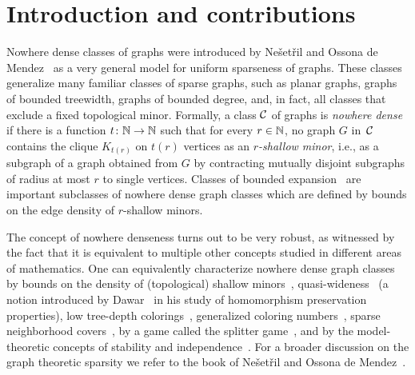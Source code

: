 \section{Introduction and contributions}\label{sec:intro}

Nowhere dense classes of graphs were introduced 
by Ne\v set\v ril and Ossona de 
Mendez~\cite{nevsetvril2010first,nevsetvril2011nowhere} as a very 
general model
for uniform sparseness of graphs. These classes generalize many 
familiar classes of sparse graphs, such as planar graphs, graphs 
of bounded treewidth,  graphs of bounded degree, and, in fact, 
all classes that exclude a fixed 
topological minor.
Formally, a class $\mathcal{C}$ of graphs is {\em{nowhere dense}} if there is a function $t\colon \mathbb{N}\to \mathbb{N}$ such that for every $r\in \mathbb{N}$, no graph $G$ in~$\mathcal{C}$ contains the clique $K_{t(r)}$ on $t(r)$ vertices  as an {\em{$r$-shallow minor}},
i.e., as a subgraph of a graph obtained from $G$ by contracting mutually disjoint  subgraphs of radius at most $r$ to single vertices.
Classes of bounded expansion~\cite{nevsetvril2008grad} 
are important subclasses 
of nowhere dense graph classes which are defined by bounds on 
the edge density of $r$-shallow minors.


The concept of nowhere denseness
turns out to be very robust, as witnessed by the fact that it is equivalent 
to multiple other concepts studied in different areas of mathematics. 
One can equivalently characterize nowhere dense graph classes 
by bounds on the density of (topological) shallow 
minors~\cite{nevsetvril2010first,nevsetvril2011nowhere},
quasi-wideness~\cite{nevsetvril2011nowhere} (a notion introduced by
Dawar~\cite{dawar2010homomorphism} in his study of homomorphism
preservation properties), low tree-depth
colorings~\cite{nevsetvril2008grad}, generalized coloring
numbers~\cite{zhu2009coloring}, sparse neighborhood
covers~\cite{GroheKRSS15,grohe2014deciding}, by a game called the
splitter game~\cite{grohe2014deciding}, and by the model-theoretic
concepts of stability and independence~\cite{adler2014interpreting}.
For a broader discussion on the graph theoretic sparsity we refer to the book
of Ne\v{s}et\v{r}il and Ossona de Mendez~\cite{sparsity}.

